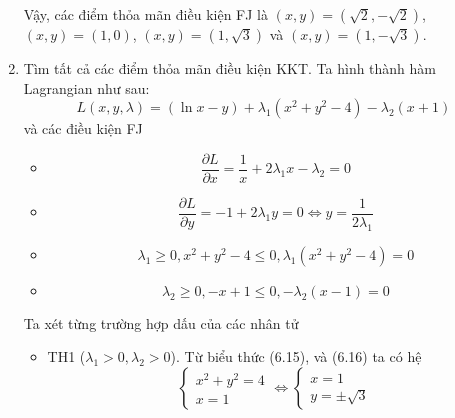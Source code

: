 \begin{solution}
\begin{enumerate}[label=(\alph*)]
\begin{itemize}
        \end{itemize}
        Vậy, các điểm thỏa mãn điều kiện FJ là $(x, y) = (\sqrt{2}, -\sqrt{2})$, $(x, y) = (1, 0)$, $(x, y) = (1, \sqrt{3})$ và $(x, y) = (1, -\sqrt{3})$.
        \item Tìm tất cả các điểm thỏa mãn điều kiện KKT.
        Ta hình thành hàm Lagrangian như sau:
        \begin{equation}
            L(x, y, \lambda) = (\ln x - y) + \lambda_1(x^2 + y^2 - 4) - \lambda_2(x + 1)
        \end{equation}
        và các điều kiện FJ
        \begin{itemize}
            \item \begin{equation}
                \dfrac{\partial L}{\partial x} = \dfrac{1}{x} + 2\lambda_1x - \lambda_2 = 0 
            \end{equation}
            \item \begin{equation}
                \dfrac{\partial L}{\partial y} = -1 + 2\lambda_1y = 0 \Leftrightarrow y = \dfrac{1}{2\lambda_1}
            \end{equation}
            \item \begin{equation}
                \lambda_1 \geq 0, x^2 + y^2 - 4 \leq 0, \lambda_1(x^2 + y^2 - 4) = 0
            \end{equation}
            \item \begin{equation}
                \lambda_2 \geq 0, -x + 1 \leq 0, -\lambda_2(x-1) = 0
            \end{equation}
        \end{itemize}
        Ta xét từng trường hợp dấu của các nhân tử
        \begin{itemize}
            \item TH1 ($\lambda_1 > 0, \lambda_2 > 0$). Từ biểu thức (6.15), và (6.16) ta có hệ
            \begin{equation}
                \begin{cases}
                    x^2 + y^2 = 4\\
                    x = 1
                \end{cases}
                \Leftrightarrow 
                \begin{cases}
                    x = 1\\
                    y = \pm\sqrt{3}
                \end{cases}

\end{equation}
\end{itemize}
\end{enumerate}
\end{solution}
